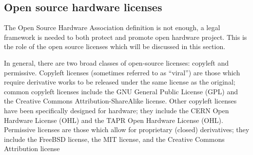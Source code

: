 \subsection{Open source hardware licenses} %

The Open Source Hardware Association definition is not enough, a legal framework is needed to both protect and promote open hardware project. This is the role of the open source licenses which will be discussed in this section.

In general, there are two broad classes of open-source licenses: copyleft and permissive. Copyleft licenses (sometimes referred to as “viral”) are those which require derivative works to be released under the same license as the original; common copyleft licenses include the GNU General Public License (GPL) and the Creative Commons Attribution-ShareAlike license. Other copyleft licenses have been specifically designed for hardware; they include the CERN Open Hardware License (OHL) and the TAPR Open Hardware License (OHL). Permissive licenses are those which allow for proprietary (closed) derivatives; they include the FreeBSD license, the MIT license, and the Creative Commons Attribution license


